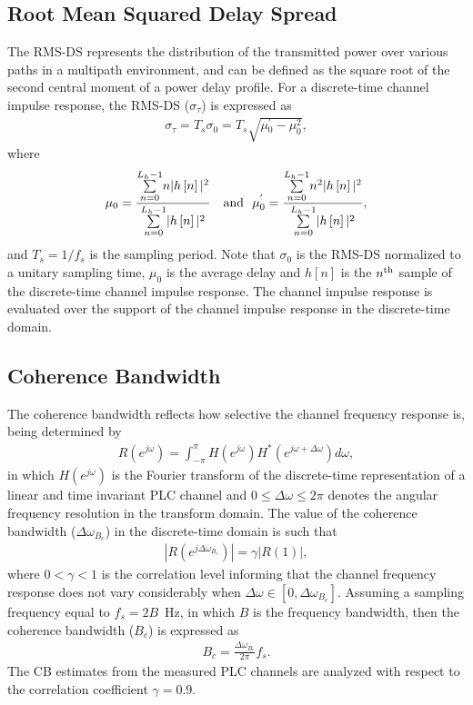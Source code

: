 \documentclass[journal]{IEEEtran}
\begin{document}
	\subsection{Root Mean Squared Delay Spread}
	The RMS-DS represents the distribution of the transmitted power over various paths in a multipath environment,
	and can be defined as the square root of the second central moment of a power delay profile.
	For a discrete-time channel impulse response, the RMS-DS ($\sigma_{\tau}$) is expressed as
	\begin{eqnarray}
	\sigma_{\tau}
	= T_{s}\sigma_{0}
	= T_{s}\sqrt{\mu{}_{0}^{'}-\mu_{0}^{2}},
	\end{eqnarray}
	where
	\begin{eqnarray}
	\mu_{0}=\frac{\overset{L_h-1}{\underset{n=0}{\sum}}n|h\left[n\right]|^{2}}{\overset{L_h-1}{\underset{n=0}{\sum}}|h\left[n\right]|^{2}}\
	~~ {\rm and} ~~
	\mu_{0}^{'}=\frac{\overset{L_h-1}{\underset{n=0}{\sum}}n^{2}|h\left[n\right]|^{2}}{\overset{L_h-1}{\underset{n=0}{\sum}}|h\left[n\right]|^{2}},
	\end{eqnarray}
	and $T_s=1/f_s$ is the sampling period.
	Note that $\sigma_{0}$ is the RMS-DS normalized to a unitary sampling time,
	$\mu_{0}$ is the average delay
	and $h[n]$ is the $n^{\rm th}$ sample of the discrete-time channel impulse response. The channel impulse response is evaluated over the support of the channel impulse response in the discrete-time domain.
	
	\subsection{Coherence Bandwidth}
	The coherence bandwidth reflects how selective the channel frequency response is, being determined by
	\begin{eqnarray}
	R(e^{j\omega})=\int_{-\pi}^{\pi} H(e^{j\omega})H^*(e^{j\omega+\Delta\omega})d \omega,
	\label{eq:CB}
	\end{eqnarray}
	in which $H(e^{j\omega})$ is the Fourier transform of the discrete-time representation of a linear and time invariant PLC channel and  $0 \leq \Delta \omega \leq 2\pi$ denotes the angular frequency resolution in the transform domain. The value of the coherence bandwidth ($\Delta \omega_{B_c}$) in the discrete-time domain is such that
	\begin{eqnarray}
	|R(e^{j\Delta \omega_{B_c}})|=\gamma|R(1)|,
	\label{eq:CB}
	\end{eqnarray}
	where $0<\gamma<1$ is the correlation level informing that the channel frequency response does not vary considerably when $\Delta \omega \in [0,\Delta \omega_{B_c}]$. Assuming a sampling frequency equal to $f_s=2B$~Hz, in which $B$ is the frequency bandwidth, then the coherence bandwidth ($B_c$) is expressed as
	\begin{eqnarray}
	B_c=\frac{\Delta \omega_{B_c}}{2\pi}f_s.
	\label{eq:CB}
	\end{eqnarray}
	The CB estimates from the measured PLC channels are analyzed with respect to the correlation coefficient $\gamma = 0.9$. 
	
\end{document}
